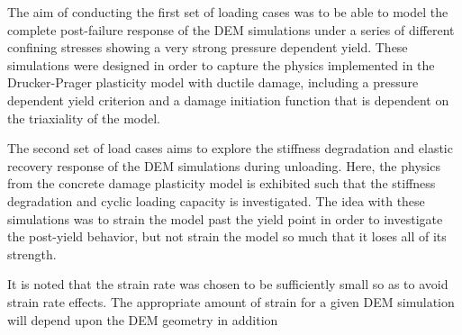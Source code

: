 The aim of conducting the first set of loading cases was to be able to model the complete post-failure response of the DEM simulations under a series of different confining stresses showing a very strong pressure dependent yield. These simulations were designed in order to capture the physics implemented in the Drucker-Prager plasticity model with ductile damage, including a pressure dependent yield criterion and a damage initiation function that is dependent on the triaxiality of the model. 

The second set of load cases aims to explore the stiffness degradation and elastic recovery response of the DEM simulations during unloading. Here, the physics from the concrete damage plasticity model is exhibited such that the stiffness degradation and cyclic loading capacity is investigated. The idea with these simulations was to strain the model past the yield point in order to investigate the post-yield behavior,
but not strain the model so much that it loses all of its strength.

It is noted that the strain rate was chosen to be sufficiently small
so as to avoid strain rate effects. The appropriate amount of strain
for a given DEM simulation will depend upon the DEM geometry in addition
